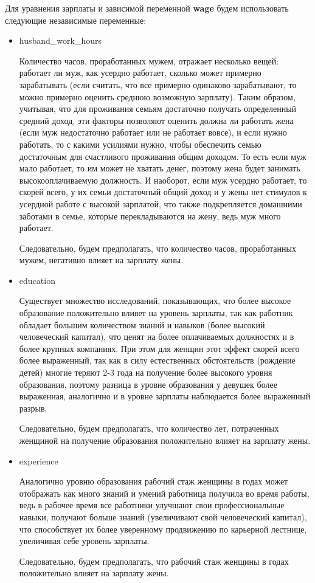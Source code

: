 \documentclass[a4paper,12pt]{article}
\begin{document}
	Для уравнения зарплаты и зависимой переменной \textbf{wage} будем использовать следующие независимые переменные:
	
	\begin{itemize}
		\item husband\_work\_hours
		
		Количество часов, проработанных мужем, отражает несколько вещей: работает ли муж, как усердно работает, сколько может примерно зарабатывать (если считать, что все примерно одинаково зарабатывают, то можно примерно оценить среднюю возможную зарплату). Таким образом, учитывая, что для проживания семьям достаточно получать определенный средний доход, эти факторы позволяют оценить должна ли работать жена (если муж недостаточно работает или не работает вовсе), и если нужно работать, то с какими усилиями нужно, чтобы обеспечить семью достаточным для счастливого проживания общим доходом. То есть если муж мало работает, то им может не хватать денег, поэтому жена будет занимать высокооплачиваемую должность. И наоборот, если муж усердно работает, то скорей всего, у их семьи достаточный общий доход и у жены нет стимулов к усердной работе с высокой зарплатой, что также подкрепляется домашними заботами в семье, которые перекладываются на жену, ведь муж много работает.
		
		
		Следовательно, будем предполагать, что количество часов, проработанных мужем, негативно влияет на зарплату жены.
		
		\item education
	
		Существует множество исследований, показывающих, что более высокое образование положительно влияет на уровень зарплаты, так как работник обладает большим количеством знаний и навыков (более высокий человеческий капитал), что ценят на более оплачиваемых должностях и в более крупных компаниях. При этом для женщин этот эффект скорей всего более выраженный, так как в силу естественных обстоятельств (рождение детей)  многие теряют 2-3 года на получение более высокого уровня образования, поэтому разница в уровне образования у девушек более выраженная, аналогично и в уровне зарплаты наблюдается более выраженный разрыв.
		
		Следовательно, будем предполагать, что количество лет, потраченных женщиной на
		получение образования положительно влияет на зарплату жены.
		
		\item experience
		
		Аналогично уровню образования рабочий стаж женщины в годах может отображать как много знаний и умений работница получила во время работы, ведь в рабочее время все работники улучшают свои профессиональные навыки, получают больше знаний (увеличивают свой человеческий капитал), что способствует их более уверенному продвижению по карьерной лестнице, увеличивая себе уровень зарплаты. 
		
		Следовательно, будем предполагать, что рабочий стаж женщины в годах положительно влияет на зарплату жены.
		
	\end{itemize}
\end{document}
